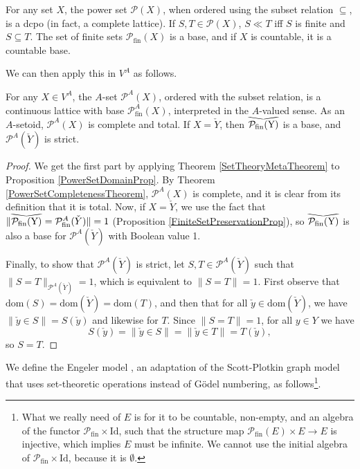 \documentclass{lmcs}
\newcommand{\pfin}{\ensuremath{\powerset_{\mathrm{fin}}}}
\newcommand{\dom}{\ensuremath{\mathrm{dom}}}
\newcommand{\Id}{\ensuremath{\mathrm{Id}}}
\newcommand{\powerset}{\ensuremath{\mathcal{P}}}
\newcommand{\apowerset}{\powerset^A}
\newcommand{\apfin}{\apowerset_{\mathrm{fin}}}
\newcommand{\verywidecheck}[1]{
	\savestack{\tmpbox}{\stretchto{
			\scaleto{
				\scalerel*[\widthof{\ensuremath{#1}}]{\kern-.6pt\bigvee\kern-.6pt}
				{\rule[-\textheight/2]{1ex}{\textheight}}
			}{\textheight}
		}{0.5ex}}
	\stackon[1pt]{#1}{\tmpbox}
}
\begin{document}
\begin{prop}
	\label{PowerSetDomainProp}
	For any set $X$, the power set $\powerset(X)$, when ordered using the subset relation $\subseteq$, is a dcpo (in fact, a complete lattice). If $S,T \in \powerset(X)$, $S \ll T$ iff $S$ is finite and $S \subseteq T$. The set of finite sets $\pfin(X)$ is a base, and if $X$ is countable, it is a countable base. 
\end{prop}
We can then apply this in $V^A$ as follows. 

\begin{prop}
	\label{PowerSetBVDomainProp}
	For any $X \in V^A$, the $A$-set $\apowerset(X)$, ordered with the subset relation, is a continuous lattice with base $\apfin(X)$, interpreted in the $A$-valued sense. As an $A$-setoid, $\apowerset(X)$ is complete and total. If $X = \check{Y}$, then $\verywidecheck{\pfin(Y)}$ is a base, and $\apowerset(\check{Y})$ is strict. 
\end{prop}
\begin{proof}
We get the first part by applying Theorem \ref{SetTheoryMetaTheorem} to Proposition \ref{PowerSetDomainProp}. By Theorem \ref{PowerSetCompletenessTheorem}, $\apowerset(X)$ is complete, and it is clear from its definition that it is total. Now, if $X = \check{Y}$, we use the fact that $\| \verywidecheck{\pfin(Y)} = \apfin(\check{Y}) \| = 1$ (Proposition \ref{FiniteSetPreservationProp}), so $\verywidecheck{\pfin(Y)}$ is also a base for $\apowerset(\check{Y})$ with Boolean value 1. 
	
Finally, to show that $\apowerset(\check{Y})$ is strict, let $S,T \in \apowerset(\check{Y})$ such that $\| S = T \|_{\apowerset(\check{Y})} = 1$, which is equivalent to $\| S = T \| = 1$. First observe that $\dom(S) = \dom(\check{Y}) = \dom(T)$, and then that for all $\check{y} \in \dom(\check{Y})$, we have $\| \check{y} \in S \| = S(\check{y})$ and likewise for $T$. Since $\| S = T \| = 1$, for all $y \in Y$ we have 
\[
	S(\check{y}) = \| \check{y} \in S \| = \| \check{y} \in T \| = T(\check{y}),
\]
so $S = T$. 
\end{proof}

We define the Engeler model \cite{engeler1981,barendregt84}, an adaptation of the Scott-Plotkin graph model that uses set-theoretic operations instead of G\"odel numbering, as follows\footnote{What we really need of $E$ is for it to be countable, non-empty, and an algebra of the functor $\pfin \times \Id$, such that the structure map $\pfin(E) \times E \rightarrow E$ is injective, which implies $E$ must be infinite. We cannot use the initial algebra of $\pfin \times \Id$, because it is $\emptyset$.}. 
\end{document}
